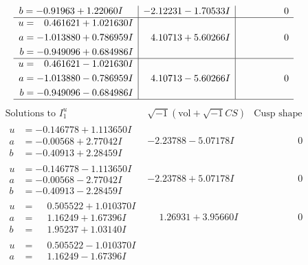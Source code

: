 \documentclass[1p]{elsarticle_modified}
\theoremstyle{definition}
\newcommand{\I}{\sqrt{-1}}
\begin{document}
$$\begin{array}{c|c|c}
\begin{aligned}
b &= -0.91963 + 1.22060 I\end{aligned}
 & -2.12231 - 1.70533 I & \phantom{-0.000000 } 0 \\ \hline\begin{aligned}
u &= \phantom{-}0.461621 + 1.021630 I \\
a &= -1.013880 + 0.786959 I \\
b &= -0.949096 + 0.684986 I\end{aligned}
 & \phantom{-}4.10713 + 5.60266 I & \phantom{-0.000000 } 0 \\ \hline\begin{aligned}
u &= \phantom{-}0.461621 - 1.021630 I \\
a &= -1.013880 - 0.786959 I \\
b &= -0.949096 - 0.684986 I\end{aligned}
 & \phantom{-}4.10713 - 5.60266 I & \phantom{-0.000000 } 0\\
 \hline 
 \end{array}$$\newpage$$\begin{array}{c|c|c}  
\text{Solutions to }I^u_{1}& \I (\text{vol} + \sqrt{-1}CS) & \text{Cusp shape}\\
 \hline 
\begin{aligned}
u &= -0.146778 + 1.113650 I \\
a &= -0.00568 + 2.77042 I \\
b &= -0.40913 + 2.28459 I\end{aligned}
 & -2.23788 - 5.07178 I & \phantom{-0.000000 } 0 \\ \hline\begin{aligned}
u &= -0.146778 - 1.113650 I \\
a &= -0.00568 - 2.77042 I \\
b &= -0.40913 - 2.28459 I\end{aligned}
 & -2.23788 + 5.07178 I & \phantom{-0.000000 } 0 \\ \hline\begin{aligned}
u &= \phantom{-}0.505522 + 1.010370 I \\
a &= \phantom{-}1.16249 + 1.67396 I \\
b &= \phantom{-}1.95237 + 1.03140 I\end{aligned}
 & \phantom{-}1.26931 + 3.95660 I & \phantom{-0.000000 } 0 \\ \hline\begin{aligned}
u &= \phantom{-}0.505522 - 1.010370 I \\
a &= \phantom{-}1.16249 - 1.67396 I \\

\end{aligned}
\end{array}$$
\end{document}
